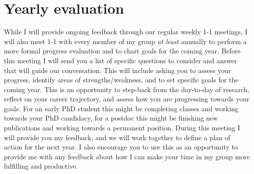 \documentclass{classassignments}
\begin{document}
\section{Yearly evaluation}\label{sec:Yearly}
While I will provide ongoing feedback through our regular weekly 1-1 meetings, I will also meet 1-1 with every member of my group \textit{at least} annually to perform a more formal progress evaluation and to chart goals for the coming year. Before this meeting I will send you a list of specific questions to consider and answer that will guide our conversation. This will include asking you to assess your progress, identify areas of strengths/weakness, and to set specific goals for the coming year. This is an opportunity to step-back from the day-to-day of research, reflect on your career trajectory, and assess how you are progressing towards your goals. For an early PhD student this might be completing classes and working towards your PhD candidacy, for a postdoc this might be finishing new publications and working towards a permanent position. During this meeting I will provide you my feedback, and we will work together to define a plan of action for the next year. I also encourage you to use this as an opportunity to provide me with any feedback about how I can make your time in my group more fulfilling and productive. 

%
%
\end{document}
